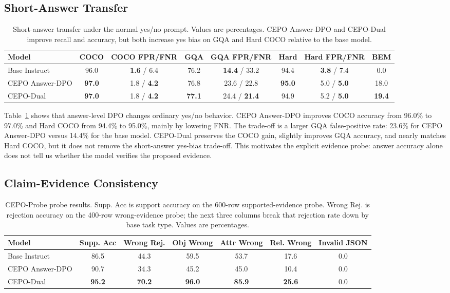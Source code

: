 \documentclass[10pt,twocolumn,letterpaper]{article}
\newcommand{\benchmark}{CEPO-Probe}
\newcommand{\answerdpo}{CEPO Answer-DPO}
\newcommand{\cepodual}{CEPO-Dual}
\begin{document}
\subsection{Short-Answer Transfer}

\begin{table}[t]
\centering
\footnotesize
\begin{tabular}{@{}lccccccc@{}}
\toprule
Model & COCO & COCO FPR/FNR & GQA & GQA FPR/FNR & Hard & Hard FPR/FNR & BEM \\
\midrule
Base Instruct & 96.0 & \textbf{1.6} / 6.4 & 76.2 & \textbf{14.4} / 33.2 & 94.4 & \textbf{3.8} / 7.4 & 0.0 \\
\answerdpo{} & \textbf{97.0} & 1.8 / \textbf{4.2} & 76.8 & 23.6 / 22.8 & \textbf{95.0} & 5.0 / \textbf{5.0} & 18.0 \\
\cepodual{} & \textbf{97.0} & 1.8 / \textbf{4.2} & \textbf{77.1} & 24.4 / \textbf{21.4} & 94.9 & 5.2 / \textbf{5.0} & \textbf{19.4} \\
\bottomrule
\end{tabular}
\caption{Short-answer transfer under the normal yes/no prompt. Values are
percentages. \answerdpo{} and \cepodual{} improve recall and accuracy, but
both increase yes bias on GQA and Hard COCO relative to the base model.}
\label{tab:short}
\end{table}

Table~\ref{tab:short} shows that answer-level DPO changes ordinary yes/no
behavior. \answerdpo{} improves COCO accuracy from 96.0\% to 97.0\% and Hard
COCO from 94.4\% to 95.0\%, mainly by lowering FNR. The trade-off is a larger
GQA false-positive rate: 23.6\% for \answerdpo{} versus 14.4\% for the base
model. \cepodual{} preserves the COCO gain, slightly improves GQA accuracy,
and nearly matches Hard COCO, but it does not remove the short-answer yes-bias
trade-off. This motivates the explicit evidence probe: answer accuracy alone
does not tell us whether the model verifies the proposed evidence.

\subsection{Claim-Evidence Consistency}

\begin{table}[t]
\centering
\small
\begin{tabular}{lcccccc}
\toprule
Model & Supp. Acc & Wrong Rej. & Obj Wrong & Attr Wrong & Rel. Wrong & Invalid JSON \\
\midrule
Base Instruct & 86.5 & 44.3 & 59.5 & 53.7 & 17.6 & 0.0 \\
\answerdpo{} & 90.7 & 34.3 & 45.2 & 45.0 & 10.4 & 0.0 \\
\cepodual{} & \textbf{95.2} & \textbf{70.2} & \textbf{96.0} & \textbf{85.9} & \textbf{25.6} & 0.0 \\
\bottomrule
\end{tabular}
\caption{\benchmark{} probe results. Supp. Acc is support accuracy on the
600-row supported-evidence probe. Wrong Rej. is rejection accuracy on the
400-row wrong-evidence probe; the next three columns break that rejection rate
down by base task type. Values are percentages.}
\label{tab:probe}
\end{table}
\end{document}
